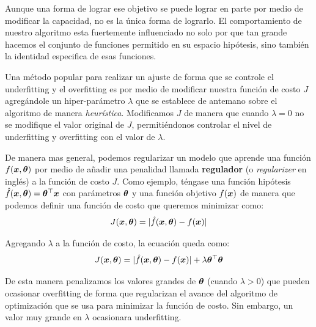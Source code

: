 Aunque una forma de lograr ese objetivo se puede lograr en parte por medio de modificar la capacidad, no es la única forma de lograrlo. El comportamiento de nuestro algoritmo esta fuertemente influenciado no solo por que tan grande hacemos el conjunto de funciones permitido en su espacio hipótesis, sino también la identidad especifica de esas funciones.

Una método popular para realizar un ajuste de forma que se controle el \gls{underfitting} y el \gls{overfitting} es por medio de modificar nuestra función de costo $J$ agregándole un hiper-parámetro $\lambda$ que se establece de antemano sobre el algoritmo de manera \textit{heurística}. Modificamos $J$ de manera que cuando $\lambda = 0$ no se modifique el valor original de $J$, permitiéndonos controlar el nivel de \gls{underfitting} y \gls{overfitting} con el valor de $\lambda$.

De manera mas general, podemos regularizar un modelo que aprende una función $f({\bm{x}}, {\bm{\theta}})$ por medio de añadir una penalidad llamada \textbf{regulador} (o \textsl{regularizer} en inglés) a la función de costo $J$. Como ejemplo, téngase una función hipótesis $\hat{f}({\bm{x}}, {\bm{\theta}}) = {\bm{\theta}}^{\top} {\bm{x}}$ con parámetros ${\bm{\theta}}$ y una función objetivo $f({\bm{x}})$ de manera que podemos definir una función de costo que queremos minimizar como:
\begin{equation}
  J({\bm{x}}, {\bm{\theta}}) = | \hat{f}({\bm{x}}, {\bm{\theta}}) - f({\bm{x}}) |
\end{equation}

Agregando $\lambda$ a la función de costo, la ecuación queda como:
\begin{equation}
  J({\bm{x}}, {\bm{\theta}}) = | \hat{f}({\bm{x}}, {\bm{\theta}}) - f({\bm{x}}) | + \lambda {\bm{\theta}}^{\top} {\bm{\theta}}
\end{equation}

De esta manera penalizamos los valores grandes de ${\bm{\theta}}$ (cuando $\lambda > 0$) que pueden ocasionar \gls{overfitting} de forma que regularizan el avance del algoritmo de optimización que se usa para minimizar la función de costo. Sin embargo, un valor muy grande en $\lambda$ ocasionara \gls{underfitting}.

